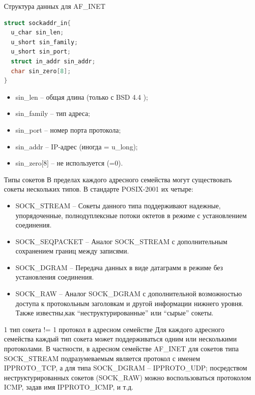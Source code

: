 \begin{frame}[fragile]{Структура данных для AF\_INET}
\begin{lstlisting}[language=C]
struct sockaddr_in{
  u_char sin_len;
  u_short sin_family;
  u_short sin_port;
  struct in_addr sin_addr;
  char sin_zero[8];
}
\end{lstlisting}

\begin{itemize}
	\item sin\_len -- общая длина (только с BSD 4.4 );
	\item sin\_family -- тип адреса;
	\item sin\_port -- номер порта протокола;
	\item sin\_addr -- IP-адрес (иногда = u\_long);
	\item sin\_zero[8] -- не используется (=0).
\end{itemize}
\end{frame}

\begin{frame}{Типы сокетов}
В пределах каждого адресного семейства могут существовать сокеты нескольких типов. В стандарте POSIX-2001 их четыре:
\begin{itemize}
	\item SOCK\_STREAM -- Сокеты данного типа поддерживают надежные, упорядоченные, полнодуплексные потоки октетов в режиме с установлением соединения. 
	\item SOCK\_SEQPACKET -- Аналог SOCK\_STREAM с дополнительным сохранением границ между записями. 
	\item SOCK\_DGRAM -- Передача данных в виде датаграмм в режиме без установления соединения. 
	\item SOCK\_RAW -- Аналог SOCK\_DGRAM с дополнительной возможностью доступа к протокольным заголовкам и другой информации нижнего уровня. Также известны,как ``неструктурированные'' или ``сырые'' сокеты.
\end{itemize}
\end{frame}

\begin{frame}{1 тип сокета != 1 протокол в адресном семействе}
Для каждого адресного семейства каждый тип сокета может поддерживаться одним или несколькими протоколами. В частности, в адресном семействе AF\_INET для сокетов типа SOCK\_STREAM подразумеваемым является протокол с именем IPPROTO\_TCP, а для типа SOCK\_DGRAM -- IPPROTO\_UDP; посредством неструктурированных сокетов (SOCK\_RAW) можно воспользоваться протоколом ICMP, задав имя IPPROTO\_ICMP, и т.д. 
\end{frame}

